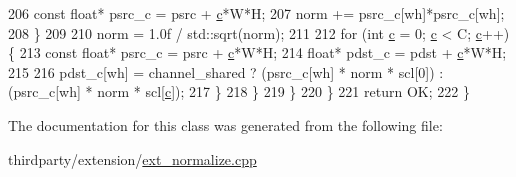 \begin{DoxyCode}
206                         \textcolor{keyword}{const} \textcolor{keywordtype}{float}* psrc\_c = psrc + \hyperlink{CMakeCache_8txt_aac1d6a1710812201527c735f7c6afbaa}{c}*W*H;
207                         norm += psrc\_c[wh]*psrc\_c[wh];
208                     \}
209 
210                     norm = 1.0f / std::sqrt(norm);
211 
212                     \textcolor{keywordflow}{for} (\textcolor{keywordtype}{int} \hyperlink{CMakeCache_8txt_aac1d6a1710812201527c735f7c6afbaa}{c} = 0; \hyperlink{CMakeCache_8txt_aac1d6a1710812201527c735f7c6afbaa}{c} < C; \hyperlink{CMakeCache_8txt_aac1d6a1710812201527c735f7c6afbaa}{c}++) \{
213                         \textcolor{keyword}{const} \textcolor{keywordtype}{float}* psrc\_c = psrc + \hyperlink{CMakeCache_8txt_aac1d6a1710812201527c735f7c6afbaa}{c}*W*H;
214                         \textcolor{keywordtype}{float}* pdst\_c = pdst + \hyperlink{CMakeCache_8txt_aac1d6a1710812201527c735f7c6afbaa}{c}*W*H;
215 
216                         pdst\_c[wh] = channel\_shared ? (psrc\_c[wh] * norm * scl[0]) : (psrc\_c[wh] * norm * 
      scl[\hyperlink{CMakeCache_8txt_aac1d6a1710812201527c735f7c6afbaa}{c}]);
217                     \}
218                 \}
219             \}
220         \}
221         \textcolor{keywordflow}{return} OK;
222     \}
\end{DoxyCode}


The documentation for this class was generated from the following file\+:\begin{DoxyCompactItemize}
\item 
thirdparty/extension/\hyperlink{ext__normalize_8cpp}{ext\+\_\+normalize.\+cpp}\end{DoxyCompactItemize}
